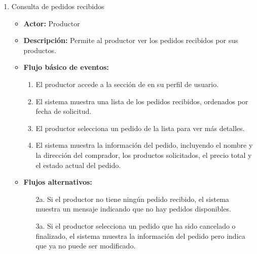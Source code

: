 \begin{enumerate}[CU-1:]
\item{Consulta de pedidos recibidos}
\begin{itemize}
	\item \textbf{Actor:} Productor
	\item \textbf{Descripción:} Permite al productor ver los pedidos recibidos por sus productos.
	\item \textbf{Flujo básico de eventos:}
	\begin{enumerate}[1:]
		\item El productor accede a la sección de  en su perfil de usuario.
		\item El sistema muestra una lista de los pedidos recibidos, ordenados por fecha de solicitud.
		\item El productor selecciona un pedido de la lista para ver más detalles.
		\item El sistema muestra la información del pedido, incluyendo el nombre y la dirección del comprador, los productos solicitados, el precio total y el estado actual del pedido.
		\end{enumerate}
	\item \textbf{Flujos alternativos:}
		\begin{itemize}
		\item [2a.] Si el productor no tiene ningún pedido recibido, el sistema muestra un mensaje indicando que no hay pedidos disponibles.
		\item [3a.] Si el productor selecciona un pedido que ha sido cancelado o finalizado, el sistema muestra la información del pedido pero indica que ya no puede ser modificado.
		\end{itemize}
\end{itemize}


\end{enumerate}
